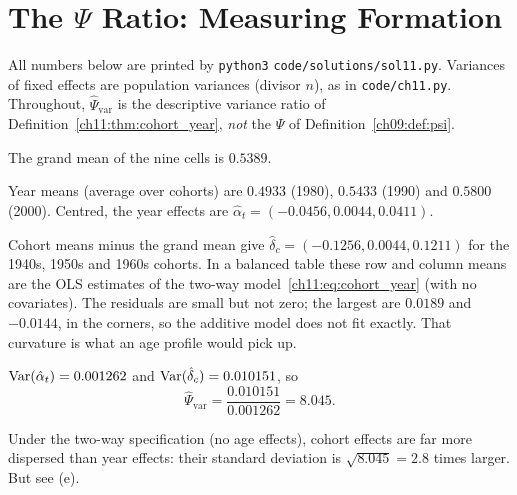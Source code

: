 \documentclass[../solutions_manual.tex]{subfiles}
\begin{document}
\ifSubfilesClassLoaded{\setcounter{chapter}{10}}{}%
\setcounter{chapter}{10}%
\chapter{The $\Psi$ Ratio: Measuring Formation}\label{sol11}
\sloppy

All numbers below are printed by \texttt{python3} \nolinkurl{code/solutions/sol11.py}. Variances of fixed effects are population variances (divisor $n$), as in \texttt{code/ch11.py}. Throughout, $\hat\Psi_{\text{var}}$ is the descriptive variance ratio of Definition~\ref{ch11:thm:cohort_year}, \emph{not} the $\Psi$ of Definition~\ref{ch09:def:psi}.

The grand mean of the nine cells is $0.5389$.

 Year means (average over cohorts) are $0.4933$ (1980), $0.5433$ (1990) and $0.5800$ (2000). Centred, the year effects are $\hat\alpha_t = (-0.0456, 0.0044, 0.0411)$.

 Cohort means minus the grand mean give $\hat\delta_c = (-0.1256, 0.0044, 0.1211)$ for the 1940s, 1950s and 1960s cohorts. In a balanced table these row and column means are the OLS estimates of the two-way model~\eqref{ch11:eq:cohort_year} (with no covariates). The residuals are small but not zero; the largest are $0.0189$ and $-0.0144$, in the corners, so the additive model does not fit exactly. That curvature is what an age profile would pick up.

 $\operatorname{Var}(\hat\alpha_t) = 0.001262$ and $\operatorname{Var}(\hat\delta_c) = 0.010151$, so
\[
\hat\Psi_{\text{var}} = \frac{0.010151}{0.001262} = 8.045 .
\]

 Under the two-way specification (no age effects), cohort effects are far more dispersed than year effects: their standard deviation is $\sqrt{8.045} = 2.8$ times larger. But see (e).
\end{document}
